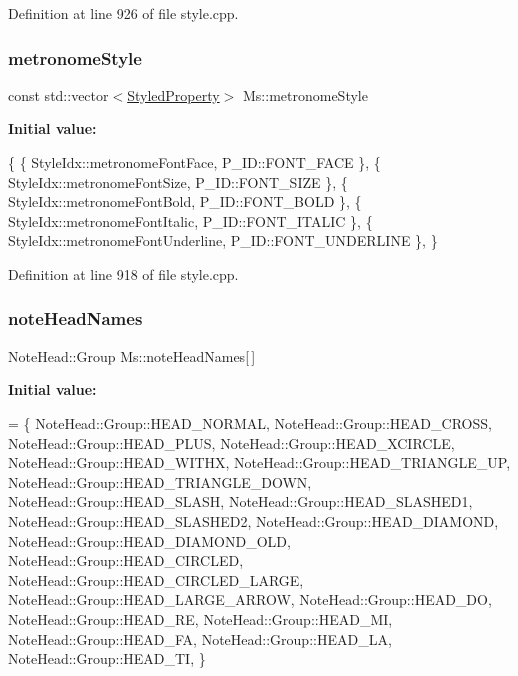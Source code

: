 Definition at line 926 of file style.\+cpp.

\mbox{\label{namespace_ms_a774d6c9f55b27f665124b8874014d9d7}} 
\subsubsection{\texorpdfstring{metronome\+Style}{metronomeStyle}}
{\footnotesize\ttfamily const std\+::vector$<$\hyperlink{struct_ms_1_1_styled_property}{Styled\+Property}$>$ Ms\+::metronome\+Style}

{\bfseries Initial value\+:}
\begin{DoxyCode}
\{
      \{ StyleIdx::metronomeFontFace,                  P\_ID::FONT\_FACE              \},
      \{ StyleIdx::metronomeFontSize,                  P\_ID::FONT\_SIZE              \},
      \{ StyleIdx::metronomeFontBold,                  P\_ID::FONT\_BOLD              \},
      \{ StyleIdx::metronomeFontItalic,                P\_ID::FONT\_ITALIC            \},
      \{ StyleIdx::metronomeFontUnderline,             P\_ID::FONT\_UNDERLINE         \},
      \}
\end{DoxyCode}


Definition at line 918 of file style.\+cpp.

\mbox{\label{namespace_ms_a8e7043cab098766c184959c505c1bb32}} 
\subsubsection{\texorpdfstring{note\+Head\+Names}{noteHeadNames}}
{\footnotesize\ttfamily Note\+Head\+::\+Group Ms\+::note\+Head\+Names\mbox{[}$\,$\mbox{]}}

{\bfseries Initial value\+:}
\begin{DoxyCode}
= \{
      NoteHead::Group::HEAD\_NORMAL,
      NoteHead::Group::HEAD\_CROSS,
      NoteHead::Group::HEAD\_PLUS,
      NoteHead::Group::HEAD\_XCIRCLE,
      NoteHead::Group::HEAD\_WITHX,
      NoteHead::Group::HEAD\_TRIANGLE\_UP,
      NoteHead::Group::HEAD\_TRIANGLE\_DOWN,
      NoteHead::Group::HEAD\_SLASH,
      NoteHead::Group::HEAD\_SLASHED1,
      NoteHead::Group::HEAD\_SLASHED2,
      NoteHead::Group::HEAD\_DIAMOND,
      NoteHead::Group::HEAD\_DIAMOND\_OLD,
      NoteHead::Group::HEAD\_CIRCLED,
      NoteHead::Group::HEAD\_CIRCLED\_LARGE,
      NoteHead::Group::HEAD\_LARGE\_ARROW,
      NoteHead::Group::HEAD\_DO,
      NoteHead::Group::HEAD\_RE,
      NoteHead::Group::HEAD\_MI,
      NoteHead::Group::HEAD\_FA,
      NoteHead::Group::HEAD\_LA,
      NoteHead::Group::HEAD\_TI,
      \}
\end{DoxyCode}


